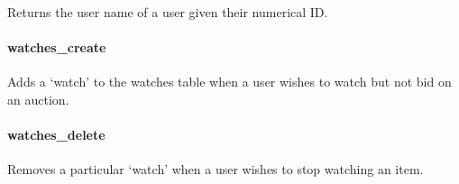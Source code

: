 Returns the user name of a user given their numerical ID.

\begin{Shaded}
\begin{Highlighting}[]
   \NormalTok{(}\NormalTok{))}
      
      \NormalTok{;}
\end{Highlighting}
\end{Shaded}

\paragraph{watches\_create}\label{watchesux5fcreate}

Adds a `watch' to the watches table when a user wishes to watch but not
bid on an auction.

\begin{Shaded}
\begin{Highlighting}[]
  \NormalTok{(}\NormalTok{), } \NormalTok{(}\NormalTok{))}
      
     
\end{Highlighting}
\end{Shaded}

\paragraph{watches\_delete}\label{watchesux5fdelete}

Removes a particular `watch' when a user wishes to stop watching an
item.

\begin{Shaded}
\begin{Highlighting}[]
  \NormalTok{(}\NormalTok{), } \NormalTok{(}\NormalTok{))}
      
     
     
\end{Highlighting}
\end{Shaded}

